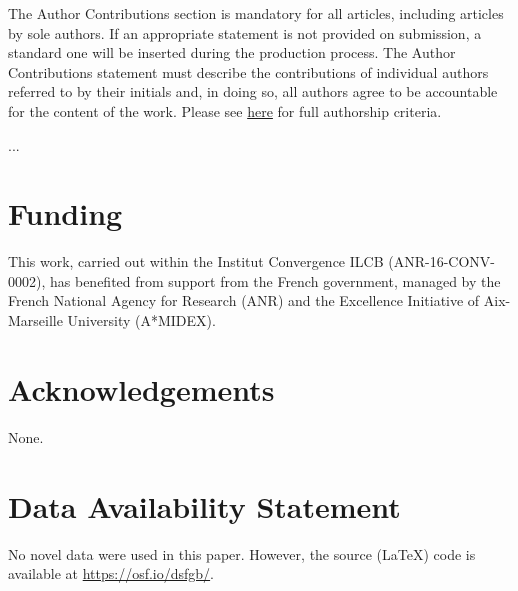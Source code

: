 \documentclass[utf8]{template/frontiersSCNS} %
\begin{document}
The Author Contributions section is mandatory for all articles, including articles by sole authors. If an appropriate statement is not provided on submission, a standard one will be inserted during the production process. The Author Contributions statement must describe the contributions of individual authors referred to by their initials and, in doing so, all authors agree to be accountable for the content of the work. Please see  \href{http://home.frontiersin.org/about/author-guidelines#AuthorandContributors}{here} for full authorship criteria.

\color{black}

...

\section*{Funding}


This work, carried out within the Institut Convergence ILCB (ANR-16-CONV-0002), has benefited from support from the French government, managed by the French National Agency for Research (ANR) and the Excellence Initiative of Aix-Marseille University (A*MIDEX).

\section*{Acknowledgements}

None.



\section*{Data Availability Statement}

No novel data were used in this paper. However, the source (\LaTeX) code is available at \url{https://osf.io/dsfgb/}.
\end{document}
